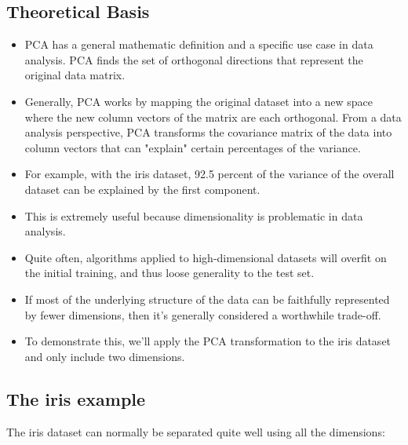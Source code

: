 \documentclass[SKL-MASTER.tex]{subfiles}
\begin{document}
\subsection{Theoretical Basis}
\begin{itemize}
\item PCA has a general mathematic definition and a specific use case in data analysis. PCA finds
the set of orthogonal directions that represent the original data matrix.
\item Generally, PCA works by mapping the original dataset into a new space where the new column
vectors of the matrix are each orthogonal. From a data analysis perspective, PCA transforms
the covariance matrix of the data into column vectors that can "explain" certain percentages
of the variance. 
\item For example, with the iris dataset, 92.5 percent of the variance of the
overall dataset can be explained by the first component.
\item This is extremely useful because dimensionality is problematic in data analysis.
\item Quite often,
algorithms applied to high-dimensional datasets will overfit on the initial training, and thus
loose generality to the test set.
\item If most of the underlying structure of the data can be faithfully
represented by fewer dimensions, then it's generally considered a worthwhile trade-off.
\item To demonstrate this, we'll apply the PCA transformation to the iris dataset and only
include two dimensions. 
\end{itemize}

\subsection*{The iris example}

The iris dataset can normally be separated quite well using
all the dimensions:
\end{document}

